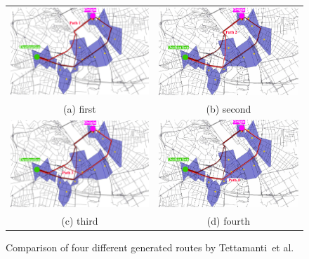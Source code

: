 \documentclass[master,english]{hgbthesis}
\begin{document}
\begin{figure}

\begin{tabular}{cc}

  \includegraphics[width=65mm]{./images/tattipath0.png} 

  &   \includegraphics[width=65mm]{./images/tattipath1.pdf} \\

(a) first & (b) second \\[6pt]

 \includegraphics[width=65mm]{./images/tattipath2.png} 

 &   \includegraphics[width=65mm]{./images/tattipath3.pdf} \\

(c) third & (d) fourth \\[6pt]

\end{tabular}

\caption{Comparison of four different generated routes by Tettamanti~et al.\ \cite{Tettamanti2012}}

\label{fig:tettaroutes}

\end{figure}
\end{document}

